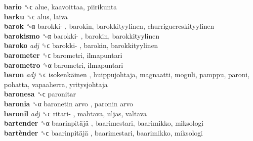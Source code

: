 \textbf{bario} ␝ϲ  alue, kaavoittaa, piirikunta  \\
\textbf{barku} ␝ϲ  alus, laiva  \\
\textbf{barok} ␝α   barokki- , barokin, barokkityylinen, churriguereskityylinen  \\
\textbf{barokismo} ␝α   barokki- , barokin, barokkityylinen  \\
\textbf{baroko} \emph{adj}  ␝ϲ   barokki- , barokin, barokkityylinen  \\
\textbf{barometer} ␝ϲ  barometri, ilmapuntari  \\
\textbf{barometro} ␝α  barometri, ilmapuntari  \\
\textbf{baron} \emph{adj}  ␝ϲ   isokenkäinen , huippujohtaja, magnaatti, moguli, pamppu, paroni, pohatta, vapaaherra, yritysjohtaja  \\
\textbf{baronesa} ␝ϲ  paronitar  \\
\textbf{baronia} ␝α   baronetin arvo ,  paronin arvo   \\
\textbf{baronil} \emph{adj}  ␝ϲ   ritari- , mahtava, uljas, valtava  \\
\textbf{bartender} ␝α   baarinpitäjä , baarimestari, baarimikko, miksologi  \\
\textbf{bartènder} ␝ϲ   baarinpitäjä , baarimestari, baarimikko, miksologi  \\
